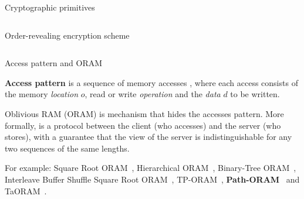 \begin{frame}{Cryptographic primitives}
\begin{columns}[T,onlytextwidth]
{\begin{block}{Order-revealing encryption scheme }
					\end{block}
			}

		\end{columns}

		\vspace*{3ex}

		\begin{columns}[T,onlytextwidth]


		\end{columns}


	\end{frame}

	\begin{frame}{Access pattern and ORAM}

		\textbf{Access pattern} is a sequence of memory accesses \oramProgram{}, where each access consists of the memory \emph{location} $o$, read \oramRead{} or write \oramWrite{} \emph{operation} and the \emph{data} $d$ to be written.

		Oblivious RAM (ORAM) is mechanism that hides the accesses pattern.
		More formally, \oram{} is a protocol between the client \client{} (who accesses) and the server \server{} (who stores), with a guarantee that the view of the server is indistinguishable for any two sequences of the same lengths.

		\begin{center}
		\end{center}

		For example: Square Root ORAM~\cite{oram-theory}, Hierarchical ORAM~\cite{oram-original}, Binary-Tree ORAM~\cite{binary-tree-oram}, Interleave Buffer Shuffle Square Root ORAM~\cite{shortest-path-oram}, TP-ORAM~\cite{tp-oram}, \textbf{Path-ORAM}~\cite{path-oram} and TaORAM~\cite{taostore}.

	\end{frame}

